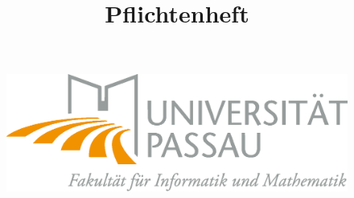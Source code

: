 \documentclass[10pt]{scrreprt}
\begin{document}
\thispagestyle{empty}
\sffamily
 
\title{Pflichtenheft}

\begin{figure}
\begin{flushright}
	\includegraphics[scale=0.4]{uniLogo.eps}
\vspace{2.0 cm}
\end{flushright}
\end{figure}
\end{document}
